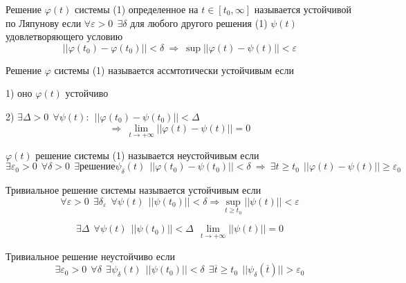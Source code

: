 \begin{define}
  Решение $\varphi(t)$ системы (1) определенное на $t \in [t_0, \infty]$
  называется устойчивой по Ляпунову если $\forall \varepsilon > 0 ~~ \exists
  \delta$ для любого другого решения (1) $\psi(t)$ удовлетворяющего условию
  $$
  ||\varphi(t_0) - \varphi(t_0)|| < \delta ~ \Rightarrow ~ \sup||\varphi(t) -
  \psi(t)|| < \varepsilon
  $$
\end{define}

\begin{define}
  Решение $\varphi$ системы (1) называется ассмтотически устойчивым если

  1) оно $\varphi(t)$ устойчиво

  2) $\exists \Delta > 0 ~~ \forall \psi(t): ~~ || \varphi(t_0) - \psi(t_0)||
  < \Delta$
  $$
  \Rightarrow ~ \lim_{t \to +\infty} ||\varphi(t) - \psi(t)|| = 0
  $$
\end{define}


\begin{define}
  $\varphi(t)$ решение системы (1) называется неустойчивым если
  $$
  \exists \varepsilon_0 > 0 ~~ \forall \delta > 0 ~~ \exists \text{решение}
  \psi_{\delta}(t) ~~ ||\varphi(t_0) - \psi(t_0)|| < \delta ~ \Rightarrow ~
  \exists t \ge t_0 ~~ || \varphi(t) - \psi(t)|| \ge \varepsilon_0
  $$
\end{define}

\begin{define}
  Тривиальное решение системы называется устойчивым если
  $$
  \forall \varepsilon > 0 ~~ \exists \delta_{\varepsilon} ~~ \forall \psi(t) ~~
  ||\psi(t_0)|| < \delta \Rightarrow \sup_{t \ge t_0} ||\psi(t)|| < \varepsilon
  $$
\end{define}

\begin{define}
  $$
  \exists \Delta ~~ \forall \psi(t) ~~ ||\psi(t_0)|| < \Delta ~~
  \lim_{t \to + \infty} ||\psi(t)|| = 0
  $$
\end{define}

\begin{define}
  Тривиальное решение неустойчиво если
  $$
  \exists \varepsilon_0 > 0 ~~ \forall \delta ~~ \exists \psi_{\delta}(t) ~~
  ||\psi(t_0)|| < \delta ~~ \exists \overline{t} \ge t_0 ~~
  ||\psi_{\delta}(\overline{t})|| > \varepsilon_0
  $$
\end{define}

